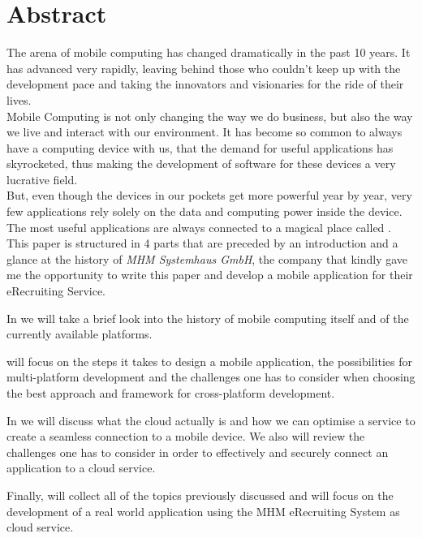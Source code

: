 \begingroup
\let\clearpage\relax
\let\cleardoublepage\relax
\let\cleardoublepage\relax
\vfill
{}
\chapter*{Abstract}
The arena of mobile computing has changed dramatically in the past 10 years. It has advanced very rapidly, leaving behind those who couldn't keep up with the development pace and taking the innovators and visionaries for the ride of their lives.\\
\newline
Mobile Computing is not only changing the way we do business, but also the way we live and interact with our environment. It has become so common to always have a computing device with us, that the demand for useful applications has skyrocketed, thus making the development of software for these devices a very lucrative field.\\
\newline
But,  even though the devices in our pockets get more powerful year by year, very few applications rely solely on the data and computing power inside the device. The most useful applications are always connected to a magical place called .\\
\newline
This paper is structured in 4 parts that are preceded by an introduction and a glance at the history of \emph{MHM Systemhaus GmbH}, the company that kindly gave me the opportunity to write this paper and develop a mobile application for their eRecruiting Service.

In  we will take a brief look into the history of mobile computing itself and of the currently available platforms. 

 will focus on the steps it takes to design a mobile application, the possibilities for multi-platform development and the challenges one has to consider when choosing the best approach and framework for cross-platform development.

In  we will discuss what the cloud actually is and how we can optimise a service to create a seamless connection to a mobile device. We also will review the challenges one has to consider in order to effectively and securely connect an application to a cloud service.

Finally,  will collect all of the topics previously discussed and will focus on the development of a real world application using the MHM eRecruiting System as cloud service.       


\vfill


\endgroup			

\vfill